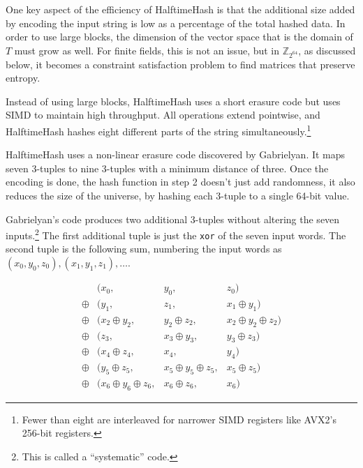 \documentclass[acmsmall, nonacm]{acmart}
\newcommand{\ints}{\mathbb{Z}}
\begin{document}
One key aspect of the efficiency of HalftimeHash is that the additional size added by encoding the input string is low as a percentage of the total hashed data.
In order to use large blocks, the dimension of the vector space that is the domain of $T$ must grow as well.
For finite fields, this is not an issue, but in $\ints_{2^{64}}$, as discussed below, it becomes a constraint satisfaction problem to find matrices that preserve entropy.

Instead of using large blocks, HalftimeHash uses a short erasure code but uses SIMD to maintain high throughput.
All operations extend pointwise, and HalftimeHash hashes eight different parts of the string simultaneously.\footnote{Fewer than eight are interleaved for narrower SIMD registers like AVX2's 256-bit registers.}

HalftimeHash uses a non-linear erasure code discovered by Gab\-ri\-el\-yan. \cite{9-7-erasure-code}
It maps seven 3-tuples to nine 3-tuples with a minimum distance of three.
Once the encoding is done, the hash function in step 2 doesn't just add randomness, it also reduces the size of the universe, by hashing each 3-tuple to a single 64-bit value.

Gabrielyan's code produces two additional 3-tuples without altering the seven inputs.\footnote{This is called a ``systematic'' code.}
The first additional tuple is just the \texttt{xor} of the seven input words.
The second tuple is the following sum, numbering the input words as $(x_0, y_0, z_0), (x_1, y_1, z_1), \dots$.

\begin{displaymath}
  \begin{array}{rlcr}
       & (x_0, & y_0, & z_0)\\
\oplus & (y_1,  & z_1,  & x_1 \oplus{} y_1) \\
\oplus & (x_2 \oplus{} y_2,& y_2 \oplus{} z_2,& x_2 \oplus{} y_2 \oplus{} z_2)\\
\oplus & (z_3,    &x_3 \oplus{} y_3,& y_3 \oplus{} z_3) \\
\oplus & (x_4 \oplus{} z_4,& x_4,& y_4)\\
\oplus & (y_5 \oplus{} z_5,& x_5 \oplus{} y_5 \oplus{} z_5,& x_5\oplus{}z_5)\\
\oplus & (x_6 \oplus{} y_6 \oplus{} z_6,& x_6 \oplus{} z_6,& x_6)
  \end{array}
\end{displaymath}
\end{document}

